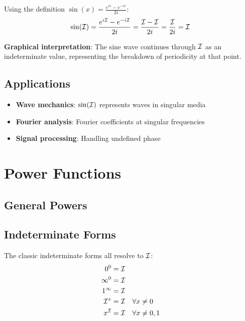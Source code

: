 \begin{proposition}[Sine at $\I$]
Using the definition $\sin(x) = \frac{e^{ix} - e^{-ix}}{2i}$:
\[
\sin(\mathcal{I}) = \frac{e^{i\mathcal{I}} - e^{-i\mathcal{I}}}{2i} = \frac{\mathcal{I} - \mathcal{I}}{2i} = \frac{\mathcal{I}}{2i} = \mathcal{I}
\]
\end{proposition}

\textbf{Graphical interpretation}: The sine wave continues through $\I$ as an indeterminate value, representing the breakdown of periodicity at that point.

\subsection*{Applications}

\begin{itemize}
    \item \textbf{Wave mechanics}: $\sin(\mathcal{I})$ represents waves in singular media
    \item \textbf{Fourier analysis}: Fourier coefficients at singular frequencies
    \item \textbf{Signal processing}: Handling undefined phase
\end{itemize}

\section*{Power Functions}

\subsection*{General Powers}


\subsection*{Indeterminate Forms}

The classic indeterminate forms all resolve to $\I$:
\begin{align*}
0^0 &= \mathcal{I} \\
\infty^0 &= \mathcal{I} \\
1^\infty &= \mathcal{I} \\
\mathcal{I}^x &= \mathcal{I} \quad \forall x \neq 0 \\
x^{\mathcal{I}} &= \mathcal{I} \quad \forall x \neq 0, 1
\end{align*}

